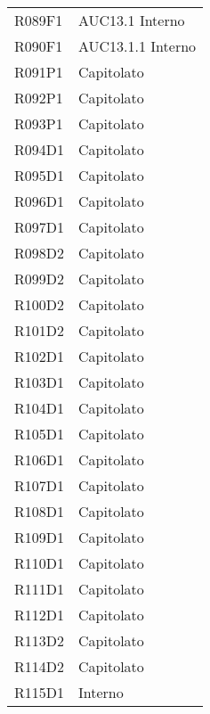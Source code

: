 \documentclass[../analisi-dei-requisiti.tex]{subfiles}
\begin{document}
\begin{center}
\begin{longtable}[H]{ p{3cm} | p{4cm} }
  R089F1                               & AUC13.1 Interno               \\
  R090F1                               & AUC13.1.1 Interno             \\
  R091P1                               & Capitolato                    \\
  R092P1                               & Capitolato                    \\
  R093P1                               & Capitolato                    \\
  R094D1                               & Capitolato                    \\
  R095D1                               & Capitolato                    \\
  R096D1                               & Capitolato                    \\
  R097D1                               & Capitolato                    \\
  R098D2                               & Capitolato                    \\
  R099D2                               & Capitolato                    \\
  R100D2                               & Capitolato                    \\
  R101D2                               & Capitolato                    \\
  R102D1                               & Capitolato                    \\
  R103D1                               & Capitolato                    \\
  R104D1                               & Capitolato                    \\
  R105D1                               & Capitolato                    \\
  R106D1                               & Capitolato                    \\
  R107D1                               & Capitolato                    \\
  R108D1                               & Capitolato                    \\
  R109D1                               & Capitolato                    \\
  R110D1                               & Capitolato                    \\
  R111D1                               & Capitolato                    \\
  R112D1                               & Capitolato                    \\
  R113D2                               & Capitolato                    \\
  R114D2                               & Capitolato                    \\
  R115D1                               & Interno                       \\
\end{longtable}
\end{center}
\end{document}
